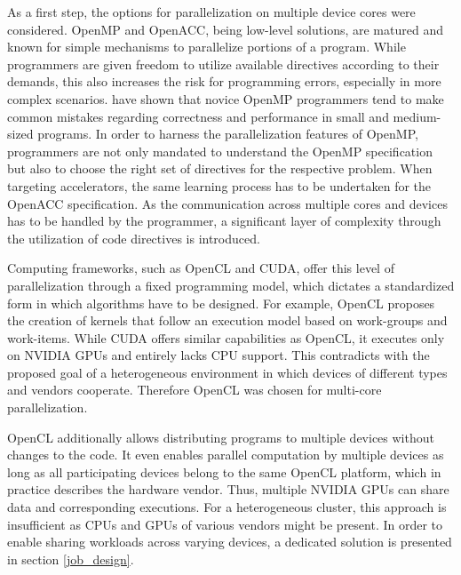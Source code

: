 As a first step, the options for parallelization on multiple device cores were considered. OpenMP and OpenACC, being low-level solutions, are matured and known for simple mechanisms to parallelize portions of a program. While programmers are given freedom to utilize available directives according to their demands, this also increases the risk for programming errors, especially in more complex scenarios. \citeauthor{openmp_mistakes} have shown that novice OpenMP programmers tend to make common mistakes regarding correctness and performance in small and medium-sized programs\cite{openmp_mistakes}. In order to harness the parallelization features of OpenMP, programmers are not only mandated to understand the OpenMP specification but also to choose the right set of directives for the respective problem. When targeting accelerators, the same learning process has to be undertaken for the OpenACC specification. As the communication across multiple cores and devices has to be handled by the programmer, a significant layer of complexity through the utilization of code directives is introduced.

Computing frameworks, such as OpenCL and CUDA, offer this level of parallelization through a fixed programming model, which dictates a standardized form in which algorithms have to be designed. For example, OpenCL proposes the creation of kernels that follow an execution model based on work-groups and work-items. While CUDA offers similar capabilities as OpenCL, it executes only on NVIDIA GPUs and entirely lacks CPU support. This contradicts with the proposed goal of a heterogeneous environment in which devices of different types and vendors cooperate. Therefore OpenCL was chosen for multi-core parallelization.

OpenCL additionally allows distributing programs to multiple devices without changes to the code. It even enables parallel computation by multiple devices as long as all participating devices belong to the same OpenCL platform, which in practice describes the hardware vendor. Thus, multiple NVIDIA GPUs can share data and corresponding executions. For a heterogeneous cluster, this approach is insufficient as CPUs and GPUs of various vendors might be present. In order to enable sharing workloads across varying devices, a dedicated solution is presented in section \ref{job_design}.

